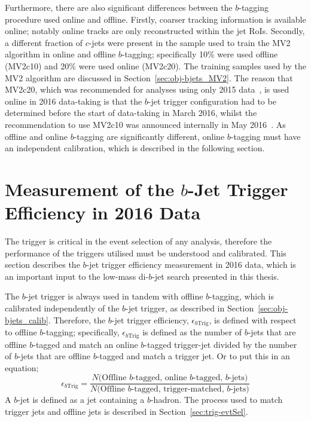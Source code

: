 Furthermore, there are also significant differences between the $b$-tagging procedure used online and offline.
Firstly, coarser tracking information is available online; notably online tracks are only reconstructed within the jet RoIs.
Secondly, a different fraction of $c$-jets were present in the sample used to train the MV2 algorithm in online and offline $b$-tagging;
specifically 10\% were used offline (MV2c10) and 20\% were used online (MV2c20).
The training samples used by the MV2 algorithm are discussed in Section~\ref{sec:obj-bjets_MV2}.
The reason that MV2c20, which was recommended for analyses using only 2015 data~\cite{obj-bjets_algo_2015}, is used online in 2016 data-taking is that the $b$-jet trigger configuration
had to be determined before the start of data-taking in March 2016,
whilst the recommendation to use MV2c10 was announced internally in May 2016~\cite{obj-bjets_algo_2016}.
As offline and online $b$-tagging are significantly different, online $b$-tagging must have an independent calibration, which is described in the following section.


\section{ Measurement of the $b$-Jet Trigger Efficiency in 2016 Data}
\label{sec:trig-bjet_eff}

The trigger is critical in the event selection of any analysis,
therefore the performance of the triggers utilised must be understood and calibrated.
This section describes the \mbox{$b$-jet} trigger efficiency measurement in 2016 data,
which is an important input to the low-mass di-$b$-jet search presented in this thesis.


The $b$-jet trigger is always used in tandem with offline $b$-tagging, which is calibrated independently of the $b$-jet trigger, as described in Section~\ref{sec:obj-bjets_calib}.
Therefore, the $b$-jet trigger efficiency, $\epsilon_{b\text{Trig}}$, is defined with respect to offline $b$-tagging;
specifically, $\epsilon_{b\text{Trig}}$ is defined as the number of $b$-jets that are offline $b$-tagged and match an online $b$-tagged trigger-jet
divided by the number of $b$-jets that are offline $b$-tagged and match a trigger jet.
Or to put this in an equation;
\begin{equation}
  \epsilon_{b\text{Trig}} = \frac{N(\text{Offline $b$-tagged, online $b$-tagged, $b$-jets)}}{N(\text{Offline $b$-tagged, trigger-matched, $b$-jets)}}
  \label{eq:trig-eff}
\end{equation}
A $b$-jet is defined as a jet containing a $b$-hadron.
The process used to match trigger jets and offline jets is described in Section~\ref{sec:trig-evtSel}.

